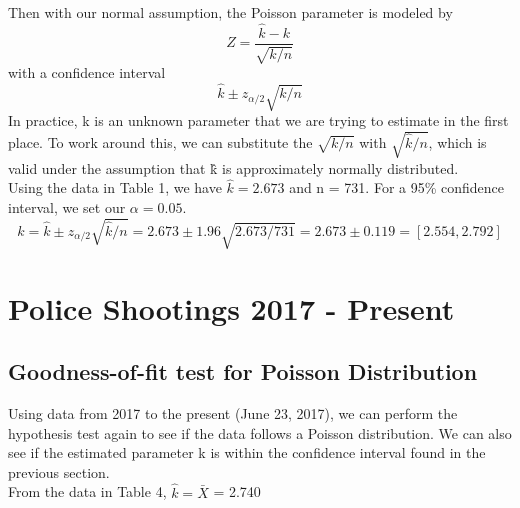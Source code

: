 \documentclass[12pt, titlepage]{article}
\begin{document}
\noindent Then with our normal assumption, the Poisson parameter is modeled by
\begin{equation*}
Z = \frac{\hat{k} - k}{\sqrt{k/n}}
\end{equation*}
with a confidence interval
\begin{equation*}
\hat{k} \pm z_{\alpha/2}\sqrt{k/n} 
\end{equation*}
\noindent In practice, k is an unknown parameter that we are trying to estimate in the first place. To work around this, we can substitute the $\sqrt{k/n}$ with $\sqrt{\hat{k}/n}$, which is valid under the assumption that \^{k} is approximately normally distributed.\\

Using the data in Table 1, we have $\hat{k} = 2.673$ and n = 731. For a 95\% confidence interval, we set our $\alpha = 0.05$.
\begin{equation*}
k = \hat{k} \pm z_{\alpha/2}\sqrt{\hat{k}/n} = 2.673 \pm 1.96\sqrt{2.673/731} = 2.673 \pm 0.119 = [2.554, 2.792]
\end{equation*} 

\pagebreak

\section{Police Shootings 2017 - Present}

\subsection{Goodness-of-fit test for Poisson Distribution}
Using data from 2017 to the present (June 23, 2017), we can perform the hypothesis test again to see if the data follows a Poisson distribution. We can also see if the estimated parameter k is within the confidence interval found in the previous section.\\

\noindent From the data in Table 4, $\hat{k} = \bar{X}$ = 2.740

\end{document}
